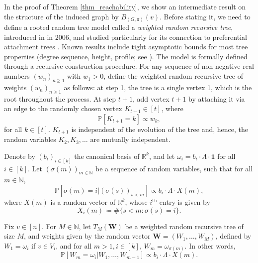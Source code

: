 \documentclass[11pt]{article}
\numberwithin{equation}{section}
\theoremstyle{definition}
\newcommand\bN{{\mathbb N}}
\newcommand\bP{{\mathbb P}}
\newcommand\bR{{\mathbb R}}
\begin{document}
In the proof of Theorem \ref{thm_reachability}, we show an intermediate result on the structure of the induced graph by $B_{(G,\pi)}(v)$. Before stating it, we need to define a rooted random tree model called a \emph{weighted random recursive tree}, introduced in \cite{BV06} in 2006, and studied particularly for its connection to preferential attachment trees \cite{BV06,HI17,MUB18,S18,ELO23}. Known results include tight asymptotic bounds for most tree properties (degree sequence, height, profile; see \cite{S18}). The model is formally defined through a recursive construction procedure. For any sequence of non-negative real numbers $(w_n)_{n\geq 1}$ with $w_1 > 0$, define the weighted random recursive tree of weights $(w_n)_{n\geq 1}$ as follows: at step 1, the tree is a single vertex 1, which is the root throughout the process. At step $t+1$, add vertex $t+1$ by attaching it via an edge to the randomly chosen vertex $K_{t+1}\in [t]$, where
$$\bP[K_{t+1} = k] \propto w_k,  $$
for all $k \in [t]$. $K_{t+1}$ is independent of the evolution of the tree and, hence, the random variables $K_2,K_3,\ldots$ are mutually independent. 

Denote by $(b_i)_{i\in [k]}$ the canonical basis of $\bR^k$, and let $\omega_i = b_i\cdot \Lambda \cdot \boldsymbol{1}$ for all $i\in [k]$. Let $(\sigma(m))_{m\in \bN} $ be a sequence of random variables, such that for all $m\in \bN$,
$$\bP[\sigma(m)=i|(\sigma(s))_{s< m }] \propto  b_i \cdot \Lambda \cdot X(m),$$
    where $X(m)$ is a random vector of $\bR^k$, whose $i^{\textrm{th}}$ entry is given by
    $$X_i(m) \coloneqq \#\{s < m: \sigma(s) = i \}.$$

Fix $v \in [n]$. For $M\in \mathbb{N}$, let $T_M(\boldsymbol{W})$ be a weighted random recursive tree of size $M$, and weights given by the random vector $\boldsymbol{W}=(W_1,\ldots,W_M)$, defined by $W_1 = \omega_i$ if $v \in V_i$, and for all $m>1, i\in[k]$, $W_m = \omega_{\sigma(m)}$. In other words,
    $$\bP[W_m = \omega_i|W_1,\ldots,W_{m-1}] \propto b_i \cdot \Lambda \cdot X(m).$$
    
\end{document}
